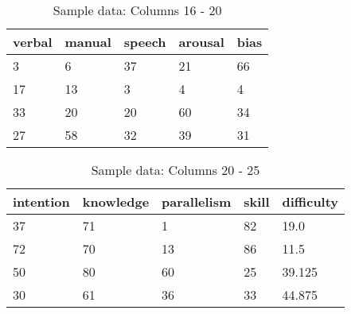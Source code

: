 \begin{table}[]
\begin{center}
  \begin{tabular}{ | l | l | l | l | l | }
    \hline
verbal & manual & speech & arousal & bias \\ \hline 
3 & 6 & 37 & 21 & 66 \\
17 & 13 & 3 & 4 & 4 \\
33 & 20 & 20 & 60 & 34\\
27 & 58 & 32 & 39 & 31\\
    \hline
  \end{tabular}
\end{center}
\caption{Sample data: Columns 16 - 20}
\label{tab:my_label}
\end{table}

\begin{table}[]
\begin{center}
  \begin{tabular}{ | l | l | l | l | l | }
    \hline
intention & knowledge & parallelism & skill & difficulty \\ \hline 
37 & 71 & 1 & 82 & 19.0 \\
72 & 70 & 13 & 86 & 11.5 \\
50 & 80 & 60 & 25 & 39.125 \\
30 & 61 & 36 & 33 & 44.875 \\
    \hline
  \end{tabular}
\end{center}
\caption{Sample data: Columns 20 - 25}
\label{tab:my_label}
\end{table}



